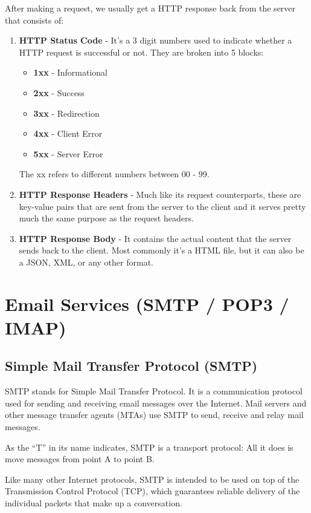 \documentclass[12pt,titlepage]{article}
\begin{document}
After making a request, we usually get a HTTP response back from the server that consists of:
\begin{enumerate}
    \item {
        \textbf{HTTP Status Code} - It's a 3 digit numbers used to indicate whether a HTTP request
        is successful or not. They are broken into 5 blocks:
        \begin{itemize}
            \item \textbf{1xx} - Informational
            \item \textbf{2xx} - Success
            \item \textbf{3xx} - Redirection
            \item \textbf{4xx} - Client Error
            \item \textbf{5xx} - Server Error
        \end{itemize}
        The xx refers to different numbers between 00 - 99.
    }
    \item {
        \textbf{HTTP Response Headers} - Much like its request counterparts, these are key-value pairs that are
        sent from the server to the client and it serves pretty much the same purpose as the request headers.
    }
    \item {
        \textbf{HTTP Response Body} - It contains the actual content that the server sends back to the client.
        Most commonly it's a HTML file, but it can also be a JSON, XML, or any other format.
    }
\end{enumerate}

\section{Email Services (SMTP / POP3 / IMAP)}

\subsection{Simple Mail Transfer Protocol (SMTP)}

SMTP stands for Simple Mail Transfer Protocol. It is a communication protocol used for sending
and receiving email messages over the Internet. Mail servers and other message transfer agents (MTAs)
use SMTP to send, receive and relay mail messages.

As the “T” in its name indicates, SMTP is a transport protocol: All it does is move messages from point A to point B.

Like many other Internet protocols, SMTP is intended to be used on top of the Transmission Control Protocol (TCP), which guarantees reliable delivery of the individual packets that make up a conversation.
\end{document}
